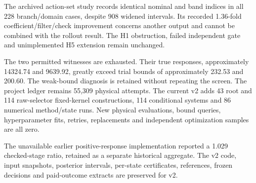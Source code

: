The archived action-set study records identical nominal and band indices in all 228 branch/domain cases, despite 908 widened intervals. Its recorded 1.36-fold coefficient/filter/check improvement concerns another output and cannot be combined with the rollout result. The H1 obstruction, failed independent gate and unimplemented H5 extension remain unchanged.

The two permitted witnesses are exhausted. Their true responses, approximately 14324.74 and 9639.92, greatly exceed trial bounds of approximately 232.53 and 200.60. The weak-bound diagnosis is retained without repeating the screen. The project ledger remains 55,309 physical attempts. The current v2 adds 43 root and 114 raw-selector fixed-kernel constructions, 114 conditional systems and 86 numerical method/state runs. New physical evaluations, bound queries, hyperparameter fits, retries, replacements and independent optimization samples are all zero.

The unavailable earlier positive-response implementation reported a 1.029 checked-stage ratio, retained as a separate historical aggregate. The v2 code, input snapshots, posterior intervals, per-state certificates, references, frozen decisions and paid-outcome extracts are preserved for v2.
